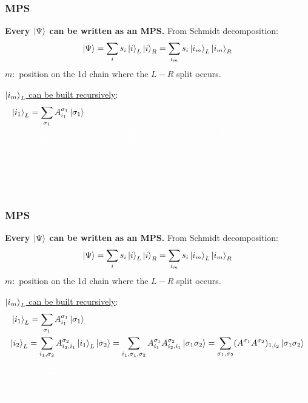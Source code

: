 \documentclass{beamer}
\theoremstyle{definition}
\begin{document}
\begin{frame}
	\frametitle{MPS}
	\textbf{Every $\ket{\Psi}$ can be written as an MPS.} From Schmidt decomposition:
	\begin{align*}
		\ket{\Psi} = \sum_{i} s_i \ket{i}_L \ket{i}_R = \sum_{i_m} s_i \ket{i_m}_L \ket{i_m}_R
	\end{align*}
	$m:$ position on the 1d chain where the $L-R$ split occurs. \\
	
	\vspace{15pt}
	\pause
	
	\underline{$\ket{i_m}_L$ can be built recursively}:
	\begin{align*}
		&\ket{i_1}_L = \sum_{\sigma_1}A^{\sigma_1}_{i_1}\ket{\sigma_1}\\ 
		&\textcolor{white}{\ket{i_2}_L = \sum_{i_1,\sigma_2} A^{\sigma_2}_{i_2,i_1}  \ket{i_1}_L \ket{\sigma_2} = \sum_{i_1,\sigma_1,\sigma_2} A^{\sigma_1}_{i_1}   A^{\sigma_2}_{i_2,i_1} \ket{\sigma_1\sigma_2} = \sum_{\sigma_1,\sigma_2} (A^{\sigma_1}A^{\sigma_2})_{1,i_2} \ket{\sigma_1\sigma_2}}\\
		&\textcolor{white}{\ket{i_3}_L = \sum_{\sigma_1,\sigma_2,\sigma_3}(A^{\sigma_1}A^{\sigma_2}A^{\sigma_3})_{1,i_3} \ket{\sigma_1\sigma_2\sigma_3}}\\
		&\textcolor{white}{\quad\vdots}
	\end{align*}
\end{frame}


\begin{frame}
	\frametitle{MPS}
	\textbf{Every $\ket{\Psi}$ can be written as an MPS.} From Schmidt decomposition:
	\begin{align*}
		\ket{\Psi} = \sum_{i} s_i \ket{i}_L \ket{i}_R = \sum_{i_m} s_i \ket{i_m}_L \ket{i_m}_R
	\end{align*}
	$m:$ position on the 1d chain where the $L-R$ split occurs. \\
	
	\vspace{15pt}
	
	\underline{$\ket{i_m}_L$ can be built recursively}:
	\begin{align*}
		&\ket{i_1}_L = \sum_{\sigma_1}A^{\sigma_1}_{i_1}\ket{\sigma_1}\\ 
		&\textcolor{black}{\ket{i_2}_L = \sum_{i_1,\sigma_2} A^{\sigma_2}_{i_2,i_1}  \ket{i_1}_L \ket{\sigma_2} = \sum_{i_1,\sigma_1,\sigma_2} A^{\sigma_1}_{i_1}   A^{\sigma_2}_{i_2,i_1} \ket{\sigma_1\sigma_2} = \sum_{\sigma_1,\sigma_2} (A^{\sigma_1}A^{\sigma_2})_{1,i_2} \ket{\sigma_1\sigma_2}}\\
		&\textcolor{white}{\ket{i_3}_L = \sum_{\sigma_1,\sigma_2,\sigma_3}(A^{\sigma_1}A^{\sigma_2}A^{\sigma_3})_{1,i_3} \ket{\sigma_1\sigma_2\sigma_3}}\\
		&\textcolor{white}{\quad\vdots}
	\end{align*}
\end{frame}
\end{document}
